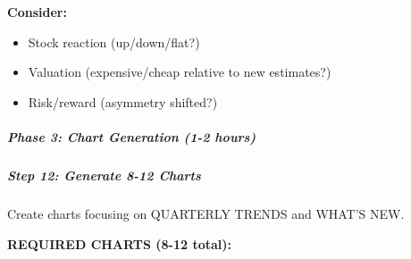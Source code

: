 \documentclass[11pt]{article}
\begin{document}
\textbf{Consider:}

\begin{itemize}[leftmargin=*,itemsep=2pt,topsep=2pt]
\item {} Stock reaction (up/down/flat?)
\item {} Valuation (expensive/cheap relative to new estimates?)
\item {} Risk/reward (asymmetry shifted?)
\end{itemize}

\subparagraph{Phase 3: Chart Generation (1-2 hours)}\mbox{}\par

\subparagraph{Step 12: Generate 8-12 Charts}\mbox{}\par

Create charts focusing on QUARTERLY TRENDS and WHAT'S NEW.


\textbf{REQUIRED CHARTS (8-12 total):}
\end{document}

